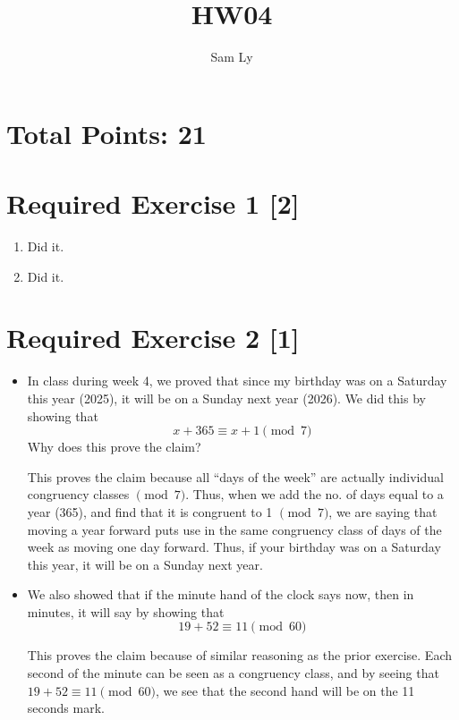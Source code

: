 \documentclass{article}
\title{HW04}
\author{Sam Ly}
\begin{document}
\maketitle

\section*{Total Points: 21}

\section*{Required Exercise 1 [2]}

\begin{enumerate}
    \item Did it.
    \item Did it.
\end{enumerate}


\section*{Required Exercise 2 [1]}

\begin{itemize}
    \item {
        In class during week 4, we proved that since my birthday was on a Saturday this year (2025), it will be on a Sunday next year (2026). We did this by showing that
        \[x + 365 \equiv x + 1 \pmod{7}\]
        Why does this prove the claim?

        This proves the claim because all ``days of the week'' are actually 
        individual congruency classes \(\pmod{7}\). Thus, when we add the no. of 
        days equal to a year (365), and find that it is congruent to 1 \(\pmod{7}\),
        we are saying that moving a year forward puts use in the same congruency 
        class of days of the week as moving one day forward. Thus, if your birthday
        was on a Saturday this year, it will be on a Sunday next year.
    }

    \item {
        We also showed that if the minute hand of the clock says now, then in 
        minutes, it will say by showing that
        \[19 + 52 \equiv 11 \pmod{60}\]

        This proves the claim because of similar reasoning as the prior exercise. 
        Each second of the minute can be seen as a congruency class, and by seeing 
        that \(19 + 52 \equiv 11 \pmod{60}\), we see that the second hand will be 
        on the 11 seconds mark.
    }
\end{itemize}
\end{document}
